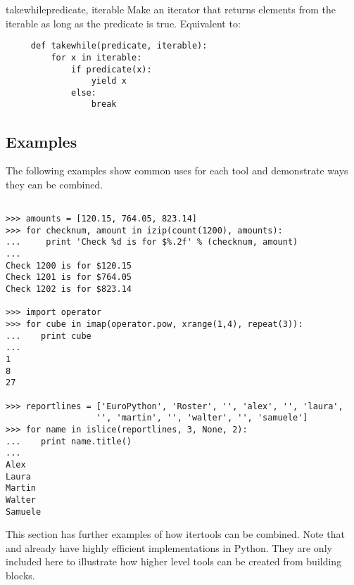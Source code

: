 \begin{funcdesc}{takewhile}{predicate, iterable}
  Make an iterator that returns elements from the iterable as long as
  the predicate is true.  Equivalent to:

  \begin{verbatim}
     def takewhile(predicate, iterable):
         for x in iterable:
             if predicate(x):
                 yield x
             else:
                 break
  \end{verbatim}
\end{funcdesc}


\subsection{Examples \label{itertools-example}}

The following examples show common uses for each tool and
demonstrate ways they can be combined.

\begin{verbatim}

>>> amounts = [120.15, 764.05, 823.14]
>>> for checknum, amount in izip(count(1200), amounts):
...     print 'Check %d is for $%.2f' % (checknum, amount)
...
Check 1200 is for $120.15
Check 1201 is for $764.05
Check 1202 is for $823.14

>>> import operator
>>> for cube in imap(operator.pow, xrange(1,4), repeat(3)):
...    print cube
...
1
8
27

>>> reportlines = ['EuroPython', 'Roster', '', 'alex', '', 'laura',
                  '', 'martin', '', 'walter', '', 'samuele']
>>> for name in islice(reportlines, 3, None, 2):
...    print name.title()
...
Alex
Laura
Martin
Walter
Samuele

\end{verbatim}

This section has further examples of how itertools can be combined.
Note that  and  already
have highly efficient implementations in Python.  They are only
included here to illustrate how higher level tools can be created
from building blocks.

